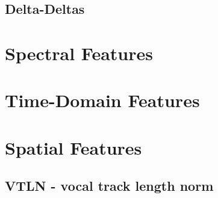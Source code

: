 \subsection{Delta-Deltas}

\section{Spectral Features}

\section{Time-Domain Features}

\section{Spatial Features}
\subsection{VTLN - vocal track length norm}
